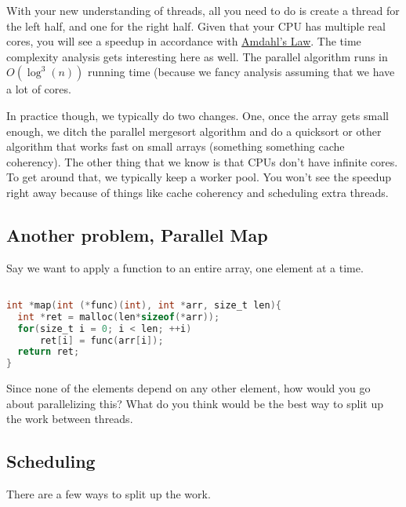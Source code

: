 With your new understanding of threads, all you need to do is create a thread for the left half, and one for the right half. Given that your CPU has multiple real cores, you will see a speedup in accordance with \href{https://en.wikipedia.org/wiki/Amdahl's_law}{Amdahl's Law}. The time complexity analysis gets interesting here as well. The parallel algorithm runs in $O(\log^3(n))$ running time (because we fancy analysis assuming that we have a lot of cores.

In practice though, we typically do two changes. One, once the array gets small enough, we ditch the parallel mergesort algorithm and do a quicksort or other algorithm that works fast on small arrays (something something cache coherency). The other thing that we know is that CPUs don't have infinite cores. To get around that, we typically keep a worker pool. You won't see the speedup right away because of things like cache coherency and scheduling extra threads.

\subsection{Another problem, Parallel Map}\label{another-problem-parallel-map}

Say we want to apply a function to an entire array, one element at a time.

\begin{lstlisting}[language=C]

int *map(int (*func)(int), int *arr, size_t len){
  int *ret = malloc(len*sizeof(*arr));
  for(size_t i = 0; i < len; ++i) 
      ret[i] = func(arr[i]);
  return ret;
}
\end{lstlisting}

Since none of the elements depend on any other element, how would you go about parallelizing this? What do you think would be the best way to split up the work between threads.

\subsection{Scheduling}\label{scheduling}

There are a few ways to split up the work. 

